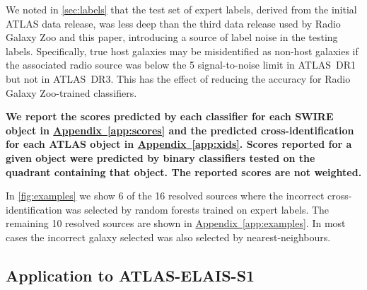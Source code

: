 \documentclass[fleqn,usenatbib,usedcolumn]{mnras}
\newcommand{\edited}[1]{{\bf {#1}}}
\newcommand{\aref}[1]{\hyperref[#1]{Appendix~\ref{#1}}}
\begin{document}
    We noted in \autoref{sec:labels} that the test set of expert labels,
    derived from the initial ATLAS data release, was less deep than the third
    data release used by Radio Galaxy Zoo and this paper, introducing a source
    of label noise in the testing labels. Specifically, true host galaxies may
    be misidentified as non-host galaxies if the associated radio source was
    below the 5 signal-to-noise limit in ATLAS~DR1 but not in ATLAS~DR3. This
    has the effect of reducing the accuracy for Radio Galaxy Zoo-trained
    classifiers.

    \edited{We report the scores predicted by each classifier for each
    SWIRE object in \aref{app:scores} and the predicted
    cross-identification for each ATLAS object in \aref{app:xids}.
    Scores reported for a given object were predicted by binary
    classifiers tested on the quadrant containing that object. The reported scores are not weighted.}

    In \autoref{fig:examples} we show 6 of the 16 resolved sources where the
    incorrect cross-identification was selected by random forests trained on
    expert labels. The remaining 10 resolved sources are shown in \aref{app:examples}.
    In most cases the incorrect galaxy selected was also selected by
    nearest-neighbours.

\subsection{Application to ATLAS-ELAIS-S1}
  \label{sec:elais}
\end{document}
